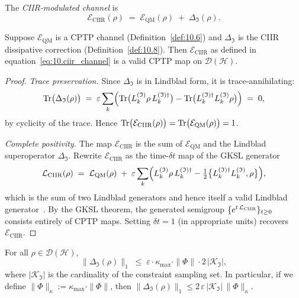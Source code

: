 \begin{definition}
\label{def:10.9}
The \emph{CIIR-modulated channel} is
\begin{equation}
\label{eq:10.ciir_channel}
  \mathcal{E}_{\mathrm{CIIR}}(\rho)
  \;=\;
  \mathcal{E}_{\mathrm{QM}}(\rho)
  \;+\;
  \Delta_{\mathfrak{I}}(\rho).
\end{equation}
\end{definition}

\begin{theorem}
\label{thm:10.2}
Suppose $\mathcal{E}_{\mathrm{QM}}$ is a CPTP channel
(Definition~\ref{def:10.6}) and $\Delta_{\mathfrak{I}}$ is the CIIR
dissipative correction (Definition~\ref{def:10.8}).  Then
$\mathcal{E}_{\mathrm{CIIR}}$ as defined in
equation~\eqref{eq:10.ciir_channel} is a valid CPTP map on
$\mathcal{D}(\mathcal{H})$.
\end{theorem}

\begin{proof}
\emph{Trace preservation.}  Since $\Delta_{\mathfrak{I}}$ is in
Lindblad form, it is trace-annihilating:
\[
  \mathrm{Tr}\bigl(\Delta_{\mathfrak{I}}(\rho)\bigr)
  \;=\;
  \varepsilon\sum_k
  \Bigl(
    \mathrm{Tr}\bigl(L_k^{(\mathfrak{I})}\rho\,L_k^{(\mathfrak{I})\dagger}\bigr)
    -
    \mathrm{Tr}\bigl(L_k^{(\mathfrak{I})\dagger}L_k^{(\mathfrak{I})}\rho\bigr)
  \Bigr)
  \;=\;0,
\]
by cyclicity of the trace.  Hence
$\mathrm{Tr}\bigl(\mathcal{E}_{\mathrm{CIIR}}(\rho)\bigr)
=\mathrm{Tr}\bigl(\mathcal{E}_{\mathrm{QM}}(\rho)\bigr)=1$.

\emph{Complete positivity.}  The map $\mathcal{E}_{\mathrm{CIIR}}$
is the sum of $\mathcal{E}_{\mathrm{QM}}$ and the Lindblad
superoperator $\Delta_{\mathfrak{I}}$.  Rewrite
$\mathcal{E}_{\mathrm{CIIR}}$ as the time-$\delta t$ map of the
GKSL generator
\[
  \mathcal{L}_{\mathrm{CIIR}}(\rho)
  \;=\;
  \mathcal{L}_{\mathrm{QM}}(\rho)
  \;+\;
  \varepsilon\sum_k
  \Bigl(
    L_k^{(\mathfrak{I})}\rho\,L_k^{(\mathfrak{I})\dagger}
    -\tfrac{1}{2}\bigl\{L_k^{(\mathfrak{I})\dagger}L_k^{(\mathfrak{I})},\rho\bigr\}
  \Bigr),
\]
which is the sum of two Lindblad generators and hence itself a valid
Lindblad generator~\cite{lindblad1976}.  By the GKSL theorem, the
generated semigroup $\{e^{t\,\mathcal{L}_{\mathrm{CIIR}}}\}_{t\geq 0}$
consists entirely of CPTP maps.  Setting $\delta t=1$ (in appropriate
units) recovers $\mathcal{E}_{\mathrm{CIIR}}$.
\end{proof}

\begin{lemma}
\label{lem:10.1}
For all $\rho\in\mathcal{D}(\mathcal{H})$,
\begin{equation}
\label{eq:10.norm_bound}
  \bigl\|\Delta_{\mathfrak{I}}(\rho)\bigr\|_1
  \;\leq\;
  \varepsilon\cdot\kappa_{\max}\cdot\|\Phi\|
  \cdot
  2\,|\mathcal{K}_{\mathfrak{I}}|,
\end{equation}
where $|\mathcal{K}_{\mathfrak{I}}|$ is the cardinality of the
constraint sampling set.  In particular, if we define
$\|\Phi\|_{\kappa}:= \kappa_{\max}\cdot\|\Phi\|$, then
$\|\Delta_{\mathfrak{I}}(\rho)\|_1 \leq
2\,\varepsilon\,|\mathcal{K}_{\mathfrak{I}}|\,\|\Phi\|_{\kappa}$.
\end{lemma}

